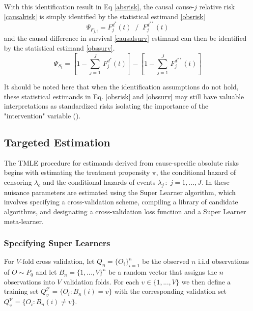 \documentclass{report}
\newcommand{\1}{\ensuremath{\mathbf{1}}}
\newcommand{\g}{\ensuremath{\pi}}
\begin{document}
With this identification result in Eq \eqref{absrisk}, the causal cause-\(j\) relative risk \eqref{causalrisk} is simply identified by the statistical estimand \eqref{obsrisk} 
\begin{equation}
\Psi_{F_{j,t}} = F^{d^*}_j(t) \;\; / \;\; F^{d^{**}}_j(t) \label{obsrisk}
\end{equation}
and the causal difference in survival \eqref{causalsurv} estimand can then be identified by the statistical estimand \eqref{obssurv}.
\begin{equation}
\Psi_{S_{t}} = \left[1 - \sum_{j = 1}^{J} \, F^{d^*}_j(t) \right] - \left[1 - \sum_{j = 1}^{J} \,  F^{d^{**}}_j(t) \right] \label{obssurv}
\end{equation}

It should be noted here that when the identification assumptions do not hold, these statistical estimands in Eq. \eqref{obsrisk} and \eqref{obssurv} may still have valuable interpretations as standardized risks isolating the importance of the "intervention" variable (\cite{laan_statistical_2006}).

\subsection{Targeted Estimation}
\label{estimation}
The TMLE procedure for estimands derived from cause-specific absolute risks begins with estimating the treatment propensity \(\g\), the conditional hazard of censoring \(\lambda_c\) and the conditional hazards of events \(\lambda_j \,:\; j = 1, \dots, J\). In  these nuisance parameters are estimated using the Super Learner algorithm, which involves specifying a cross-validation scheme, compiling a library of candidate algorithms, and designating a cross-validation loss function and a Super Learner meta-learner.

\subsubsection{Specifying Super Learners}
\label{cv}
For \(V\text{-fold}\) cross validation, let \(Q_n = \{O_i\}_{i=1}^n\) be the observed \(n\) i.i.d observations of \(O \sim P_0\) and let \(B_n = \{1, ... , V\}^n\) be a random vector that assigns the \(n\) observations into \(V\) validation folds. For each \(v \in \{1, ..., V\}\) we then define a training set \(Q^\mathcal{T}_v = \{O_i : B_n(i) = v\}\) with the corresponding validation set \(Q^\mathcal{V}_v = \{O_i : B_n(i) \neq v\}\). 
\end{document}
